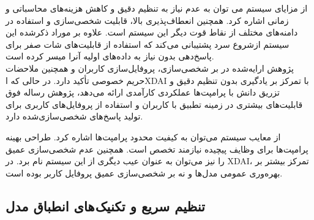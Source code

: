 از مزایای سیستم %
\cite{yu2022xdai}
 می توان به عدم نیاز به تنظیم دقیق و کاهش هزینه‌های محاسباتی و زمانی اشاره کرد. همچنین انعطاف‌پذیری بالا، قابلیت شخصی‌سازی و استفاده در دامنه‌های مختلف از نقاط قوت دیگر این سیستم است. علاوه بر موراد ذکرشده این سیستم ازشروع سرد پشتیبانی می کند که استفاده از قابلیت‌های شات صفر برای پاسخ‌دهی بدون نیاز به داده‌های اولیه آنرا میسر کرده است.\\

پژوهش ارایه‌شده در%
\cite{yu2022xdai}
 بر شخصی‌سازی، پروفایل‌سازی کاربران و همچنین ملاحضات حریم خصوصی تأکید دارد. در حالی که اXDAI با تمرکز بر یادگیری بدون تنظیم دقیق و تزریق دانش با پرامپت‌ها عملکردی کارآمدی ارائه می‌دهد، پژوهش رساله فوق قابلیت‌های بیشتری در زمینه تطبیق با کاربران و استفاده از پروفایل‌های کاربری برای تولید پاسخ‌های شخصی‌سازی‌شده دارد.

از معایب سیستم%
\cite{yu2022xdai}
می‌توان به کیفیت محدود پرامپت‌ها اشاره کرد. طراحی بهینه پرامپت‌ها برای وظایف پیچیده نیازمند تخصص است. همچنین عدم شخصی‌سازی عمیق را نیز می‌توان به عنوان عیب دیگری از این سیستم نام برد. در XDAI، تمرکز بیشتر بر بهره‌وری عمومی مدل‌ها و نه بر شخصی‌سازی عمیق پروفایل کاربر بوده است.


\subsection{تنظیم سریع و تکنیک های انطباق مدل}

